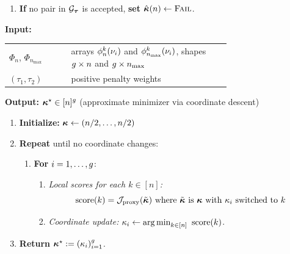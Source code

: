 \begin{algorithm}[htbp]
\begin{enumerate}
\begin{enumerate}
\begin{enumerate}
            $\Delta:=\max\{|a_n-a_n^{\mathrm{tot}}|,\ |a_{\infty}-a_{\infty}^{\mathrm{tot}}|\}$ 
      \item \textbf{If} $E_{\mathrm{cvx}}\le \varepsilon_{\mathrm{cvx}}$ \textbf{and} $\Delta\le \varepsilon_{\mathrm{amin}}$,
            \textbf{set} $\hat{\bhptrunc}(n)\gets \bhptrunc$ and \textbf{break} to the next $n$.
    \end{enumerate}
    \item \textbf{If} no pair in $\mathcal{G}_{\boldsymbol{\tau}}$ is accepted, \textbf{set} $\hat{\bm{\kappa}}(n)\gets \textsc{Fail}$.
  \end{enumerate}
\end{enumerate}
\end{algorithm}

\begin{algorithm}[htbp]
\caption{Minimize Proxy Objective Eq.\ (\ref{eq:decomp_objective_proxy})}
\label{alg:minimize-proxy}
\DontPrintSemicolon
\textbf{Input:}

\begin{tabular}{@{}l p{0.72\linewidth}}
\quad$\Phi_n$, $\Phi_{n_{\max}}$& arrays $\phi_n^{k}(\nu_i)$ and $\phi_{n_{\max}}^{k}(\nu_i)$, shapes $g \times n$ and $g \times n_{\max}$\\
\quad$(\tau_1,\tau_2)$ & positive penalty weights
\end{tabular}

\medskip
\textbf{Output:} $\bm{\kappa}^\star \in [n]^{g}$ (approximate minimizer via coordinate descent)

\medskip

\begin{enumerate}
  \item \textbf{Initialize:} $\bm{\kappa} \leftarrow (n/2, \ldots, n/2)$
  \item \textbf{Repeat} until no coordinate changes:
    \begin{enumerate}    
    \item[] \textbf{For} $i=1,\ldots,g$:
    \begin{enumerate}
      \item \emph{Local scores for each $k\in[n]$:}
            \[
                \mathrm{score}(k) = \mathcal{J}_{\mathrm{proxy}}(\tilde{\bm{\kappa}}) \text{ where } \tilde{\bm{\kappa}} \text{ is } \bm{\kappa}\text{ with } \kappa_i \text{ switched to } k
            \] 
      \item \emph{Coordinate update:} $\kappa_i \leftarrow \operatorname*{arg\,min}_{k \in [n]}~\mathrm{score}(k)$.
    \end{enumerate}
    \end{enumerate}
  \item \textbf{Return} $\bm{\kappa}^\star :=(\kappa_i)_{i=1}^{g}$.
\end{enumerate}
\end{algorithm}

